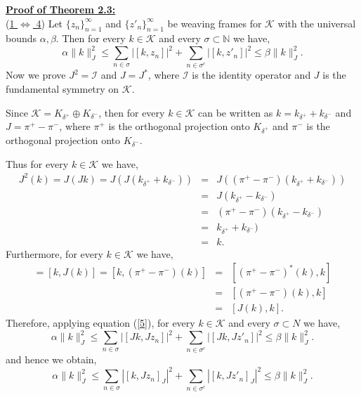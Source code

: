 \documentclass[article,12pt]{amsart}
\begin{document}
\noindent \underline{\bf Proof of Theorem 2.3:}\\
\noindent  (\underline{1 $\Longleftrightarrow$ 4}) Let $\{z_n\}_{n=1}^\infty$ and $\{z'_n\}_{n=1}^\infty$ be weaving frames for $\mathcal K$ with the universal bounds $\alpha, \beta$. Then for every $k \in \mathcal K$ and every $\sigma \subset \mathbb N$ we have, 
\begin{equation}\label{5}
	\alpha \|k\|_{J}^2 \leq \sum\limits_{n \in \sigma} |[k, z_n]|^2 + \sum\limits_{n \in \sigma^c} |[k, z'_n]|^2 \leq \beta \|k\|_{J}^2.
\end{equation}
Now we prove $J^2=\mathcal I$ and $J=J^*$, where $\mathcal I$ is the identity operator and $J$ is the fundamental symmetry on $\mathcal K$. 

Since $\mathcal K = K_{\delta^+} \oplus  K_{\delta^-}$, then for every $k \in \mathcal K$ can be written as $k=k_{\delta^+} + k_{\delta^-}$ and $J = \pi^+ - \pi^-$, where $ \pi^+$ is the orthogonal projection onto $K_{\delta^+}$ and $ \pi^-$ is the orthogonal projection onto $K_{\delta^-}$. 

Thus for every $k \in \mathcal K$ we have,
\begin{eqnarray*}
	J^2(k)=J(Jk)=J(J(k_{\delta^+} + k_{\delta^-}))&=&J( (\pi^+ - \pi^-)(k_{\delta^+} + k_{\delta^-}))\\
	&=&J(k_{\delta^+} - k_{\delta^-})\\
	&=&  (\pi^+ - \pi^-)(k_{\delta^+} - k_{\delta^-})\\
	&=& k_{\delta^+} + k_{\delta^-})\\
	&=& k.
\end{eqnarray*}
Furthermore, for every $k \in \mathcal K$ we have,
\begin{eqnarray*}
	[J^*(k), k] = [k, J(k)]=[k, (\pi^+ - \pi^-)(k)] &=& [(\pi^+ - \pi^-)^*(k), k]\\
	&=& [(\pi^+ - \pi^-)(k), k]\\
	&=& [J(k), k].
\end{eqnarray*}
Therefore, applying equation (\ref{5}), for every $k \in \mathcal K$ and every $\sigma \subset N$ we have,
\begin{equation*}
	\alpha \|k\|_{J}^2 \leq \sum\limits_{n \in \sigma} |[Jk, Jz_n]|^2 + \sum\limits_{n \in \sigma^c} |[Jk, Jz'_n]|^2 \leq \beta \|k\|_{J}^2.
\end{equation*}
and hence we obtain,
\begin{equation*}
	\alpha \|k\|_{J}^2 \leq \sum\limits_{n \in \sigma} |[k, Jz_n]_{J}|^2 + \sum\limits_{n \in \sigma^c} |[k, Jz'_n]_{J}|^2 \leq \beta \|k\|_{J}^2.
\end{equation*}
\end{document}
